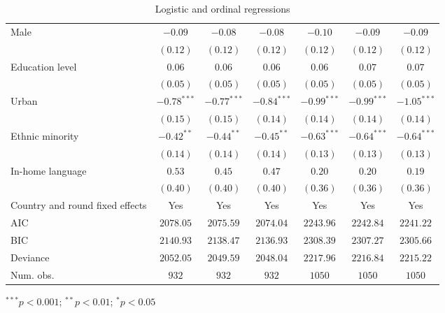 \begin{table}
\begin{center}
\begin{threeparttable}
\begin{tabular}{l c c c c c c}
Male                            & $-0.09$       & $-0.08$       & $-0.08$       & $-0.10$       & $-0.09$       & $-0.09$       \\
                                & $(0.12)$      & $(0.12)$      & $(0.12)$      & $(0.12)$      & $(0.12)$      & $(0.12)$      \\
Education level                 & $0.06$        & $0.06$        & $0.06$        & $0.06$        & $0.07$        & $0.07$        \\
                                & $(0.05)$      & $(0.05)$      & $(0.05)$      & $(0.05)$      & $(0.05)$      & $(0.05)$      \\
Urban                           & $-0.78^{***}$ & $-0.77^{***}$ & $-0.84^{***}$ & $-0.99^{***}$ & $-0.99^{***}$ & $-1.05^{***}$ \\
                                & $(0.15)$      & $(0.15)$      & $(0.14)$      & $(0.14)$      & $(0.14)$      & $(0.14)$      \\
Ethnic minority                 & $-0.42^{**}$  & $-0.44^{**}$  & $-0.45^{**}$  & $-0.63^{***}$ & $-0.64^{***}$ & $-0.64^{***}$ \\
                                & $(0.14)$      & $(0.14)$      & $(0.14)$      & $(0.13)$      & $(0.13)$      & $(0.13)$      \\
In-home language                & $0.53$        & $0.45$        & $0.47$        & $0.20$        & $0.20$        & $0.19$        \\
                                & $(0.40)$      & $(0.40)$      & $(0.40)$      & $(0.36)$      & $(0.36)$      & $(0.36)$      \\
\midrule
Country and round fixed effects & Yes           & Yes           & Yes           & Yes           & Yes           & Yes           \\
AIC                             & $2078.05$     & $2075.59$     & $2074.04$     & $2243.96$     & $2242.84$     & $2241.22$     \\
BIC                             & $2140.93$     & $2138.47$     & $2136.93$     & $2308.39$     & $2307.27$     & $2305.66$     \\
Deviance                        & $2052.05$     & $2049.59$     & $2048.04$     & $2217.96$     & $2216.84$     & $2215.22$     \\
Num. obs.                       & $932$         & $932$         & $932$         & $1050$        & $1050$        & $1050$        \\
\bottomrule
\end{tabular}
\begin{tablenotes}[flushleft]
\scriptsize{\item $^{***}p<0.001$; $^{**}p<0.01$; $^{*}p<0.05$}
\end{tablenotes}
\end{threeparttable}
\caption{Logistic and ordinal regressions}
\label{table:coefficients}
\end{center}
\end{table}
